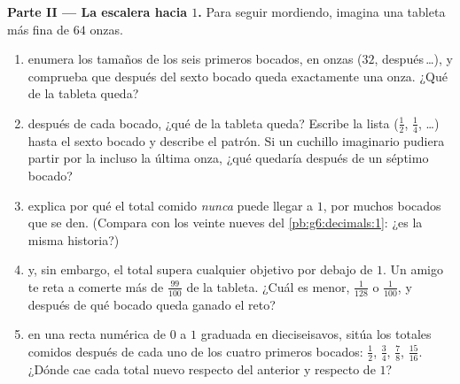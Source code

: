 \begin{problem}
\medskip
\noindent\textbf{Parte II --- La escalera hacia $1$.}
Para seguir mordiendo, imagina una tableta más fina de $64$ onzas.
\begin{enumerate}[resume]
  \item enumera los tamaños de los seis primeros bocados, en onzas
        ($32$, después\,\dots), y comprueba que después del sexto bocado
        queda exactamente una onza. ¿Qué  de la tableta
        queda?
  \item después de cada bocado, ¿qué  de la tableta queda? Escribe
        la lista ($\frac12$, $\frac14$, \dots) hasta el sexto
        bocado y describe el patrón. Si un cuchillo imaginario
        pudiera partir por la  incluso la última onza, ¿qué quedaría después de
        un séptimo bocado?
  \item explica por qué el total comido \emph{nunca} puede llegar a $1$,
        por muchos bocados que se den. (Compara con los
        veinte nueves del \cref{pb:g6:decimals:1}: ¿es la misma historia?)
  \item y, sin embargo, el total supera cualquier objetivo por debajo de $1$. Un amigo
        te reta a comerte más de $\frac{99}{100}$ de la
        tableta. ¿Cuál es menor, $\frac{1}{128}$ o
        $\frac{1}{100}$, y después de qué bocado queda ganado el reto?
  \item en una recta numérica de $0$ a $1$ graduada en dieciseisavos,
        sitúa los totales comidos después de cada uno de los cuatro primeros
        bocados: $\frac12$, $\frac34$, $\frac78$, $\frac{15}{16}$.
        ¿Dónde cae cada total nuevo respecto del
        anterior y respecto de $1$?
\end{enumerate}


\end{problem}
